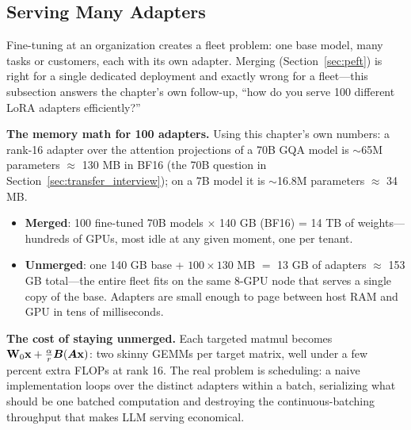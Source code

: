 \subsection{Serving Many Adapters}
\label{sec:multi_adapter_serving}

Fine-tuning at an organization creates a fleet problem: one base model, many tasks or customers, each with its own adapter. Merging (Section~\ref{sec:peft}) is right for a single dedicated deployment and exactly wrong for a fleet---this subsection answers the chapter's own follow-up, ``how do you serve 100 different LoRA adapters efficiently?''

\textbf{The memory math for 100 adapters.} Using this chapter's own numbers: a rank-16 adapter over the attention projections of a 70B GQA model is $\sim$65M parameters $\approx$ 130 MB in BF16 (the 70B question in Section~\ref{sec:transfer_interview}); on a 7B model it is $\sim$16.8M parameters $\approx$ 34 MB.
\begin{itemize}
    \item \textbf{Merged}: 100 fine-tuned 70B models $\times$ 140 GB (BF16) = 14 TB of weights---hundreds of GPUs, most idle at any given moment, one per tenant.
    \item \textbf{Unmerged}: one 140 GB base + $100 \times 130$ MB $=$ 13 GB of adapters $\approx$ 153 GB total---the entire fleet fits on the same 8-GPU node that serves a single copy of the base. Adapters are small enough to page between host RAM and GPU in tens of milliseconds.
\end{itemize}

\textbf{The cost of staying unmerged.} Each targeted matmul becomes $\mathbf{W}_0\mathbf{x} + \frac{\alpha}{r}\bm{B}(\bm{A}\mathbf{x})$: two skinny GEMMs per target matrix, well under a few percent extra FLOPs at rank 16. The real problem is scheduling: a naive implementation loops over the distinct adapters within a batch, serializing what should be one batched computation and destroying the continuous-batching throughput that makes LLM serving economical.


